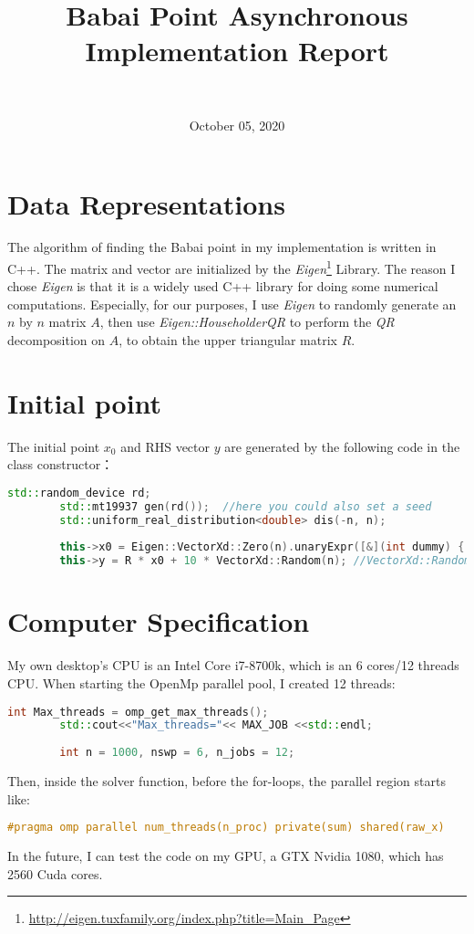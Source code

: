 \documentclass[10pt]{article}
\title{Babai Point Asynchronous Implementation Report}
\author{
	\IEEEauthorblockN{Shilei Lin} \\
	\IEEEauthorblockA{ID: 260887631\\ School of Computer Science\\
		McGill University\\
		shilei.lin@mail.mcgill.ca}
}
\date{October 05, 2020}
\begin{document}
	
	\maketitle
	\section{Data Representations}
	The algorithm of finding the Babai point in my implementation is written in C++. The matrix and vector are initialized by the \textit{Eigen}\footnote{\url{http://eigen.tuxfamily.org/index.php?title=Main_Page}} Library.
	The reason I chose \textit{Eigen} is that it is a widely used C++ library for doing some numerical computations. Especially, for our purposes, I use \textit{Eigen} to randomly generate an $n$ by $n$ matrix $A$, then use \textit{Eigen::HouseholderQR} to perform the \textit{QR} decomposition on $A$, to obtain the upper triangular matrix $R$.
	\section{Initial point}
	The initial point $x_0$ and RHS vector $y$ are generated by the following code in the class constructor：
	\begin{lstlisting}[language=c++]
		std::random_device rd;
		std::mt19937 gen(rd());  //here you could also set a seed
		std::uniform_real_distribution<double> dis(-n, n);
		
		this->x0 = Eigen::VectorXd::Zero(n).unaryExpr([&](int dummy) { return round(dis(gen)); });
		this->y = R * x0 + 10 * VectorXd::Random(n); //VectorXd::Random(n) can generate a random nx1 vector in range [-1,1].
	\end{lstlisting}
	\section{Computer Specification}
	My own desktop's CPU is an Intel Core i7-8700k, which is an 6 cores/12 threads CPU. When starting the OpenMp parallel pool, I created 12 threads:
	\begin{lstlisting}[language=c++]
		int Max_threads = omp_get_max_threads();
		std::cout<<"Max_threads="<< MAX_JOB <<std::endl;
		
		int n = 1000, nswp = 6, n_jobs = 12;
	\end{lstlisting}
	Then, inside the solver function, before the for-loops, the parallel region starts like:
	\begin{lstlisting}[language=c++]
		#pragma omp parallel num_threads(n_proc) private(sum) shared(raw_x)
	\end{lstlisting}
	In the future, I can test the code on my GPU, a GTX Nvidia 1080, which has 2560 Cuda cores.  
\end{document}
